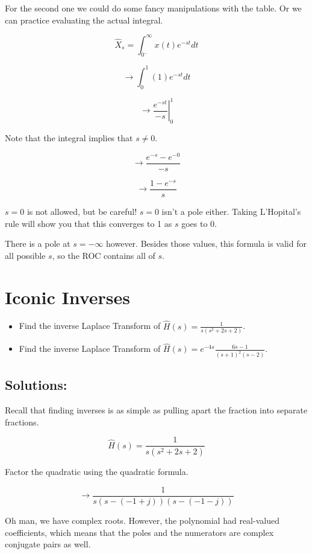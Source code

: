 \documentclass{article}
\begin{document}
\vspace{1cm}

For the second one we could do some fancy manipulations with the table. Or we can practice evaluating the actual integral.

$$\hat{X}_s = \int_{0^-}^{\infty}x(t)e^{-st}dt$$

$$\longrightarrow \int_{0}^{1}(1)e^{-st}dt$$

$$\longrightarrow \left. \frac{e^{-st}}{-s} \right\rvert^1_0$$

Note that the integral implies that $s \neq 0$.

$$\longrightarrow \frac{e^{-s} - e^{-0}}{-s}$$

$$\longrightarrow \boxed{\frac{1 - e^{-s}}{s}}$$

$s = 0$ is not allowed, but be careful! $s = 0$ isn't a pole either. Taking L'Hopital's rule will show you that this converges to 1 as $s$ goes to 0.

There is a pole at $s = -\infty$ however. Besides those values, this formula is valid for all possible $s$, so the ROC contains all of $s$.

\newpage

\section{Iconic Inverses}

\begin{itemize}
    \item Find the inverse Laplace Transform of $\hat{H}(s) = \frac{1}{s(s^2 + 2s + 2)}$.
    \item Find the inverse Laplace Transform of $\hat{H}(s) = e^{-4s}\frac{6s-1}{(s+1)^2(s-2)}$.
\end{itemize}

\subsection{Solutions:}

Recall that finding inverses is as simple as pulling apart the fraction into separate fractions.

$$\hat{H}(s) = \frac{1}{s(s^2 + 2s + 2)}$$

Factor the quadratic using the quadratic formula.

$$\longrightarrow \frac{1}{s(s-(-1 + j))(s-(-1 - j))}$$

Oh man, we have complex roots. However, the polynomial had real-valued coefficients, which means that the poles and the numerators are complex conjugate pairs as well.
\end{document}
